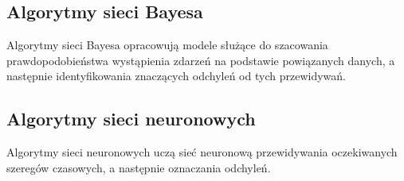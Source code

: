 \documentclass[12pt,a4paper]{article}
\begin{document}
\subsection{Algorytmy sieci Bayesa}
Algorytmy sieci Bayesa opracowują modele służące do szacowania prawdopodobieństwa wystąpienia zdarzeń na podstawie powiązanych danych, a następnie identyfikowania znaczących odchyleń od tych przewidywań.

\subsection{Algorytmy sieci neuronowych}
Algorytmy sieci neuronowych uczą sieć neuronową przewidywania oczekiwanych szeregów czasowych, a następnie oznaczania odchyleń.

\newpage


\end{document}
